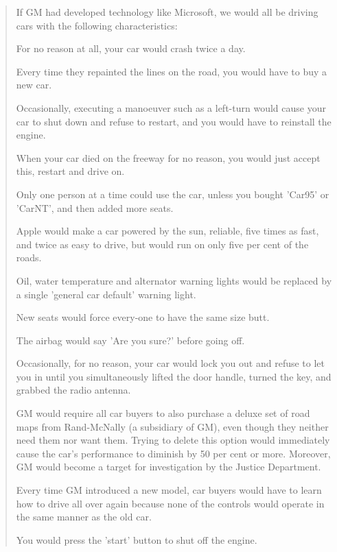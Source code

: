 \begin{quotation}
\noindent If GM had developed technology like Microsoft, we would all be driving
cars with the following characteristics: 

\begin{compactenum}
\item For no reason at all, your car would crash twice a day.
\item Every time they repainted the lines on the road, you would have to buy a
new car.
\item Occasionally, executing a manoeuver such as a left-turn would cause your
car to shut down and refuse to restart, and you would have to reinstall the
engine.
\item When your car died on the freeway for no reason, you would just accept
this, restart and drive on.
\item Only one person at a time could use the car, unless you bought 'Car95' or
'CarNT', and then added more seats.
\item Apple would make a car powered by the sun, reliable, five times as fast,
and twice as easy to drive, but would run on only five per cent of the roads.
\item Oil, water temperature and alternator warning lights would be replaced by
a single 'general car default' warning light.
\item New seats would force every-one to have the same size butt.
\item The airbag would say 'Are you sure?' before going off.
\item Occasionally, for no reason, your car would lock you out and refuse to let
you in until you simultaneously lifted the door handle, turned the key, and
grabbed the radio antenna.
\item GM would require all car buyers to also purchase a deluxe set of road maps
from Rand-McNally (a subsidiary of GM), even though they neither need them nor
want them. Trying to delete this option would immediately cause the car's
performance to diminish by 50 per cent or more. Moreover, GM would become a
target for investigation by the Justice Department.
\item Every time GM introduced a new model, car buyers would have to learn how
to drive all over again because none of the controls would operate in the same
manner as the old car.
\item You would press the 'start' button to shut off the engine.
\end{compactenum}
\end{quotation}

